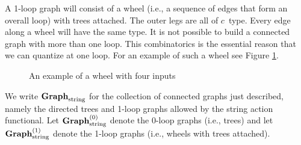 A 1-loop graph will consist of a wheel (i.e., a sequence of edges that form an overall loop)
with trees attached.
The outer legs are all of $c$~type.
Every edge along a wheel will have the same type.
It is not possible to build a connected graph with more than one loop.
This combinatorics is the essential reason that we can quantize at one loop.
For an example of such a wheel see Figure \ref{fig:wheel}.

\begin{figure}
\caption{An example of a wheel with four inputs}
\label{fig:wheel}
\end{figure}

We write ${\bf Graph}_{\rm string}$ for the collection of connected graphs just described,
namely the directed trees and 1-loop graphs allowed by the string action functional.
Let ${\bf Graph}_{\rm string}^{(0)}$ denote the 0-loop graphs (i.e., trees) and let ${\bf Graph}_{\rm string}^{(1)}$ denote the 1-loop graphs (i.e., wheels with trees attached).



